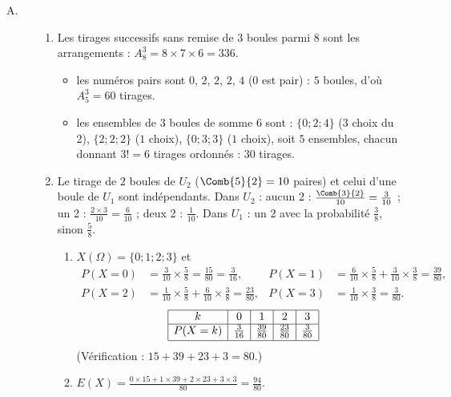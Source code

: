 	\begin{description}
		\item[A.]
			\begin{enumerate}
				\item Les tirages successifs sans remise de $3$ boules parmi $8$ sont les arrangements : $A_8^3 = 8\times7\times6 = 336$.
					\begin{itemize}
						\item {}
							les numéros pairs sont $0$, $2$, $2$, $2$, $4$ ($0$ est pair) : $5$ boules, d'où $A_5^3 = 60$ tirages.

						\item {}
							les ensembles de $3$ boules de somme $6$ sont : $\{0;2;4\}$ ($3$ choix du 2), $\{2;2;2\}$ ($1$ choix),
							$\{0;3;3\}$ ($1$ choix), soit $5$ ensembles, chacun donnant $3! = 6$ tirages ordonnés : $30$ tirages.

					\end{itemize}
				\item Le tirage de $2$ boules de $U_2$ ($\Comb{5}{2} = 10$ paires) et celui d'une boule de $U_1$ sont indépendants.
					Dans $U_2$ : aucun 2 : $\frac{\Comb{3}{2}}{10} = \frac{3}{10}$ ; un 2 : $\frac{2\times3}{10} = \frac{6}{10}$ ; deux 2 : $\frac{1}{10}$.
					Dans $U_1$ : un 2 avec la probabilité $\frac{3}{8}$, sinon $\frac{5}{8}$.
					\begin{enumerate}
						\item {} $X(\Omega) = \{0;1;2;3\}$ et
							\begin{align*}
								P(X=0) &= \tfrac{3}{10}\times\tfrac{5}{8} = \tfrac{15}{80} = \tfrac{3}{16}, &
								P(X=1) &= \tfrac{6}{10}\times\tfrac{5}{8} + \tfrac{3}{10}\times\tfrac{3}{8} = \tfrac{39}{80}, \\
								P(X=2) &= \tfrac{1}{10}\times\tfrac{5}{8} + \tfrac{6}{10}\times\tfrac{3}{8} = \tfrac{23}{80}, &
								P(X=3) &= \tfrac{1}{10}\times\tfrac{3}{8} = \tfrac{3}{80}.
							\end{align*}
							\[
							\begin{array}{|c|c|c|c|c|}
								\hline
								k & 0 & 1 & 2 & 3 \\ \hline
								P(X=k) & \frac{3}{16} & \frac{39}{80} & \frac{23}{80} & \frac{3}{80} \\[.5ex] \hline
							\end{array}
							\]
							(Vérification : $15 + 39 + 23 + 3 = 80$.)
						\item {}
							$E(X) = \frac{0\times15 + 1\times39 + 2\times23 + 3\times3}{80} = \frac{94}{80}$.


\end{enumerate}
\end{enumerate}
\end{description}
